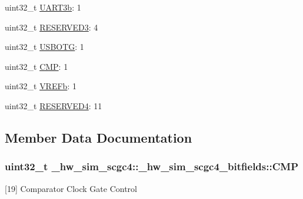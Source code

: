 \begin{DoxyCompactItemize}
\item 
uint32\+\_\+t \hyperlink{struct__hw__sim__scgc4_1_1__hw__sim__scgc4__bitfields_a5b6ccdcb37fe59cada74f8c8d3cc67fe}{U\+A\+R\+T3b}\+: 1
\item 
uint32\+\_\+t \hyperlink{struct__hw__sim__scgc4_1_1__hw__sim__scgc4__bitfields_a72351643fe3baf598997fd9db6930ca8}{R\+E\+S\+E\+R\+V\+E\+D3}\+: 4
\item 
uint32\+\_\+t \hyperlink{struct__hw__sim__scgc4_1_1__hw__sim__scgc4__bitfields_aa4a40625f18eaf76d061fa1fe80b8b13}{U\+S\+B\+O\+TG}\+: 1
\item 
uint32\+\_\+t \hyperlink{struct__hw__sim__scgc4_1_1__hw__sim__scgc4__bitfields_a53938a80d815e917ddc15794546cdb56}{C\+MP}\+: 1
\item 
uint32\+\_\+t \hyperlink{struct__hw__sim__scgc4_1_1__hw__sim__scgc4__bitfields_a81be937a4d9faf0af1f299eaf5d6f5c1}{V\+R\+E\+Fb}\+: 1
\item 
uint32\+\_\+t \hyperlink{struct__hw__sim__scgc4_1_1__hw__sim__scgc4__bitfields_af136e5230128c1f335233af1dbcf6014}{R\+E\+S\+E\+R\+V\+E\+D4}\+: 11
\end{DoxyCompactItemize}


\subsection{Member Data Documentation}
\subsubsection[{\texorpdfstring{C\+MP}{CMP}}]{\setlength{\rightskip}{0pt plus 5cm}uint32\+\_\+t \+\_\+hw\+\_\+sim\+\_\+scgc4\+::\+\_\+hw\+\_\+sim\+\_\+scgc4\+\_\+bitfields\+::\+C\+MP}\hypertarget{struct__hw__sim__scgc4_1_1__hw__sim__scgc4__bitfields_a53938a80d815e917ddc15794546cdb56}{}\label{struct__hw__sim__scgc4_1_1__hw__sim__scgc4__bitfields_a53938a80d815e917ddc15794546cdb56}
\mbox{[}19\mbox{]} Comparator Clock Gate Control 

